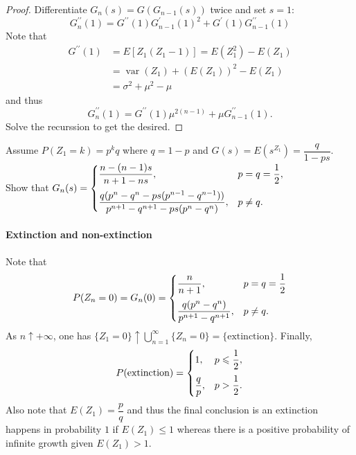 \documentclass[11pt,singlecolumn, openany, citestyle=authoryear]{elegantbook}
\begin{document}
\begin{CJK}{UTF8}{gbsn}
\begin{proof}
    Differentiate $G_n(s)=G(G_{n-1}(s))$ twice and set $s=1$:
    $$
    G_n^{\prime\prime}(1)=G^{\prime\prime}(1)G^\prime_{n-1}(1)^2+G^\prime(1)
    G^{\prime\prime}_{n-1}(1)
    $$
    Note that 
    \begin{align*}
        G^{\prime\prime}(1)&= E[Z_1(Z_1-1)]=E(Z_1^2)-E(Z_1)\\
        &=\operatorname{var}(Z_1)+(E(Z_1))^2-E(Z_1)\\
        &=\sigma^2+\mu^2-\mu
    \end{align*}
    and thus 
    $$
    G^{\prime\prime}_n(1)=G^{\prime\prime}(1)\mu^{2(n-1)}+\mu G^{\prime\prime}_{n-1}(1).
    $$
    Solve the recurssion to get the desired.
\end{proof}
\begin{example}
    Assume $P(Z_1=k)=p^kq$ where $q=1-p$ and $G(s)=E(s^{Z_1})=\dfrac{q}{1-ps}$.
    Show that $G_n(s)
    =\begin{cases}
        \vspace{1.5ex}
        \dfrac{n-(n-1)s}{n+1-ns}, & p=q=\dfrac{1}{2},\\
        \dfrac{q(p^n-q^n-ps(p^{n-1}-q^{n-1}))}{p^{n+1}-q^{n+1}-ps(p^n-q^n)},&
        p\neq q.
    \end{cases}
    $
\end{example}
\paragraph*{Extinction and non-extinction}
Note that 
$$
P(Z_n=0)=G_n(0)=\begin{cases}
    \vspace{1.5ex}
    \dfrac{n}{n+1}, & p=q=\dfrac{1}{2}\\
    \dfrac{q(p^n-q^n)}{p^{n+1}-q^{n+1}}, & p \neq q.
\end{cases}
$$
As $n\uparrow +\infty$, one has $\{Z_1=0\}\uparrow \displaystyle \bigcup_{n=1}^\infty 
\{Z_n=0\}=\{\text{extinction}\}$. Finally,
$$
P(\text{extinction}) = \begin{cases}
    \vspace{1.5ex}
    1, & p\leqslant \dfrac{1}{2},\\
    \dfrac{q}{p}, & p>\dfrac{1}{2}.
\end{cases}
$$
Also note that $E(Z_1)=\dfrac{p}{q}$ and thus the final conclusion is 
an extinction happens in probability $1$ if $E(Z_1)\leqslant 1$ whereas there is a positive probability of 
infinite growth given $E(Z_1)>1$.


\end{CJK}
\end{document}

